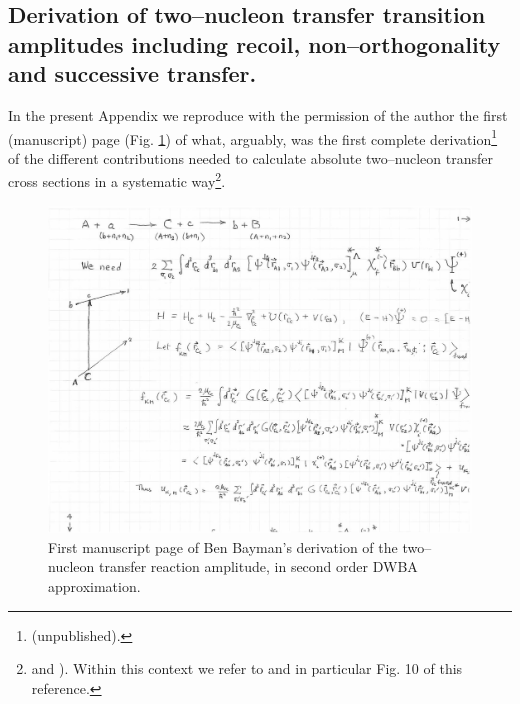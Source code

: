 \begin{subappendices}
\section[Bayman's two--nucleon transfer amplitudes]{Derivation of two--nucleon transfer transition amplitudes including recoil, non--orthogonality and successive transfer.}\label{C7AppO}
In the present Appendix we reproduce with the permission of the author the first (manuscript) page (Fig. \ref{fig5.h.1}) of what, arguably, was the first complete derivation\footnote{\cite{Bayman:70} (unpublished).} of the different contributions needed to calculate absolute two--nucleon transfer cross sections in a systematic way\footnote{ \cite{Bayman:71} and \cite{Bayman:82}). Within this context we refer to \cite{Broglia:73} and \cite{Potel:13} in particular Fig. 10 of this reference.}. 
\begin{figure}
\centerline{\includegraphics*[width=17cm,angle=0]{C7/figs_C7/fig5_H_1.pdf}}
\caption{First manuscript page of Ben Bayman's derivation of the two--nucleon transfer reaction amplitude, in second order DWBA approximation.}\label{fig5.h.1}
\end{figure}
\end{subappendices}
%
%
